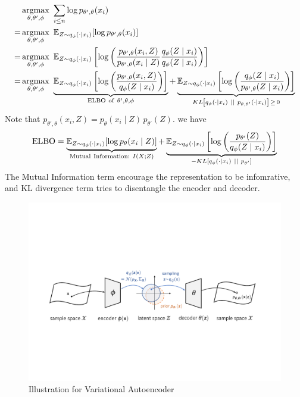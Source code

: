 \begin{align}
	& \operatorname*{argmax}_{\theta, \theta', \phi}\  \sum_{i \leq n} \log p_{\theta', \theta}(x_i) \\
	=& \operatorname*{argmax}_{\theta, \theta', \phi}\  \mathbb{E}_{Z \sim q_\phi(\cdot \mid x_i)}[\log p_{\theta', \theta}(x_i)] \\
	=& \operatorname*{argmax}_{\theta, \theta', \phi}\ \mathbb{E}_{Z \sim q_\phi(\cdot \mid x_i)}\left[ \log \left(\frac{p_{\theta', \theta}(x_i, Z)}{p_{\theta', \theta}(x_i \mid Z)} \frac{q_\phi(Z \mid x_i)}{q_\phi (Z \mid x_i)} \right) \right] \\
	=& \operatorname*{argmax}_{\theta, \theta', \phi}\ \underbrace{\mathbb{E}_{Z \sim q_\phi(\cdot \mid x_i)}\left[ \log \left(\frac{p_{\theta', \theta}(x_i, Z)}{q_\phi(Z \mid x_i)} \right) \right]}_{\mathrm{ELBO\ of\ } \theta', \theta, \phi } + \underbrace{\mathbb{E}_{Z \sim q_\phi(\cdot \mid x_i)}\left[ \log \left(\frac{q_\phi(Z \mid x_i)}{p_{\theta', \theta}(Z \mid x_i)} \right) \right]}_{KL\left[ q_\phi( \cdot \mid x_i) \ ||\   p_{\theta, \theta'}(\cdot \mid x_i)\right] \,\geq\, 0}
\end{align}
Note that $p_{\theta', \theta}(x_i, Z) = p_\theta(x_i \mid Z) \, p_{\theta'}(Z)  $. we have 
\begin{equation}
	\mathrm{ELBO} = \underbrace{\EE_{Z \sim q_\phi(\cdot \mid x_i)} [\log p_\theta(x_i \mid Z)]}_{\mathrm{Mutual\ Information:\ } I(X; Z)} + \underbrace{\EE_{Z \sim q_\phi(\cdot \mid x_i)} \left[ \log\left( \frac{p_{\theta'}(Z)}{q_\phi (Z \mid x_i)} \right) \right]}_{-KL\left[ q_\phi( \cdot \mid x_i) \ ||\  p_{\theta'}\right] }
\end{equation}
\remark The Mutual Information term encourage the representation to be infomrative, and KL divergence term tries to disentangle the encoder and decoder. 
\begin{figure}[htbp]
	\includegraphics[width=\linewidth]{figures/vae}
	\caption{Illustration for Variational Autoencoder}
\end{figure}

